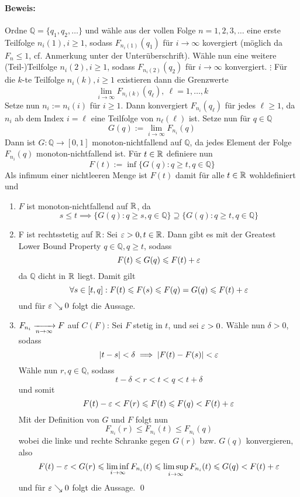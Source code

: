 \paragraph{Beweis:}Ordne $\mathbb{Q}=\{q_1,q_2,\hdots\}$ und w\"ahle aus der vollen Folge $n=1,2,3,\hdots$ eine erste Teilfolge $n_i(1),i\geq1$, sodass $F_{n_i(1)}(q_1)$ f\"ur $i\to\infty$ kovergiert (m\"oglich da $F_n\leq1$, cf. Anmerkung unter der Unter\"uberschrift). \newline
W\"ahle nun eine weitere (Teil-)Teilfolge $n_i(2),i\geq1$, sodass $F_{n_i(2)}(q_2)$ f\"ur $i\to\infty$ konvergiert. \newline
$\vdots$\newline
F\"ur die $k$-te Teilfolge $n_i(k),i\geq1$ existieren dann die Grenzwerte 
$$\lim_{i\to\infty}F_{n_i(k)}(q_\ell), \  \ell=1,\hdots,k$$
Setze nun $n_i:=n_i(i)$ f\"ur $i\geq1$. Dann konvergiert $F_{n_i}(q_\ell)$ f\"ur jedes $\ell\geq1$, da $n_i$ ab dem Index $i=\ell$ eine Teilfolge von $n_\ell(\ell)$ ist.
Setze nun f\"ur $q\in\mathbb{Q}$
$$G(q):=\lim_{i\to\infty}F_{n_i}(q)$$
Dann ist $G:\mathbb{Q}\to[0,1]$ monoton-nichtfallend auf $\mathbb{Q}$, da jedes Element der Folge $F_{n_i}(q)$ monoton-nichtfallend ist. F\"ur $t\in\mathbb{R}$ definiere nun
$$F(t):=\inf\{G(q):q\geq t,q\in\mathbb{Q}\}$$ 
Als infimum einer nichtleeren Menge ist $F(t)$ damit f\"ur alle $t\in\mathbb{R}$ wohldefiniert und 
\begin{enumerate}
    \item $F$ ist monoton-nichtfallend auf $\mathbb{R}$, da
    $$s\leq t\implies\{G(q):q\geq s,q\in\mathbb{Q}\}\supseteq\{G(q):q\geq t,q\in\mathbb{Q}\}$$
    \item F ist rechtsstetig auf $\mathbb{R}$:\newline
    Sei $\varepsilon>0,t\in\mathbb{R}$. Dann gibt es mit der Greatest Lower Bound Property $q\in\mathbb{Q},q\geq t$, sodass
    $$F(t)\leqslant G(q)\leqslant F(t)+\varepsilon$$
    da $\mathbb{Q}$ dicht in $\mathbb{R}$ liegt. Damit gilt 
    $$\forall s\in[t,q]:F(t)\leqslant F(s)\leqslant F(q)=G(q)\leqslant F(t)+\varepsilon$$
    und f\"ur $\varepsilon\searrow0$ folgt die Aussage.
    \item $F_{n_i}\nto{}{n\to\infty} F$ auf $C(F)$:\newline
    Sei $F$ stetig in $t$, und sei $\varepsilon>0$. W\"ahle nun $\delta>0$, sodass
    $$|t-s|<\delta\implies|F(t)-F(s)|<\varepsilon$$
    W\"ahle nun $r,q\in\mathbb{Q}$, sodass
    $$t-\delta<r<t<q<t+\delta$$
    und somit 
    $$F(t)-\varepsilon<F(r)\leqslant F(t)\leqslant F(q)<F(t)+\varepsilon$$
    Mit der Definition von $G$ und $F$ folgt nun 
    $$F_{n_i}(r)\leq F_{n_i}(t)\leq F_{n_i}(q)$$
    wobei die linke und rechte Schranke gegen $G(r)$ bzw. $G(q)$ konvergieren, also
    $$F(t)-\varepsilon<G(r)\leqslant\liminf_{i\to\infty}F_{n_i}(t)\leqslant\limsup_{i\to\infty}F_{n_i}(t)\leqslant G(q)<F(t)+\varepsilon$$
    und f\"ur $\varepsilon\searrow0$ folgt die Aussage. \qed
\end{enumerate}

